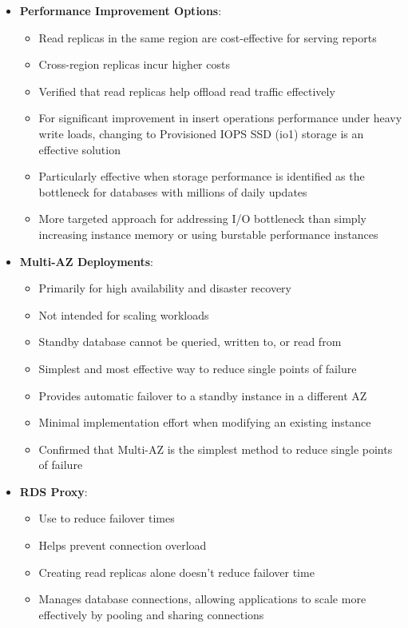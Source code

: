 \documentclass[11pt,a4paper]{report}
\begin{document}
\begin{itemize}
  \item \textbf{Performance Improvement Options}:
\begin{itemize}
  \item Read replicas in the same region are cost-effective for serving reports
  \item Cross-region replicas incur higher costs
  \item Verified that read replicas help offload read traffic effectively
  \item For significant improvement in insert operations performance under heavy write loads, changing to Provisioned IOPS SSD (io1) storage is an effective solution
  \item Particularly effective when storage performance is identified as the bottleneck for databases with millions of daily updates
  \item More targeted approach for addressing I/O bottleneck than simply increasing instance memory or using burstable performance instances
\end{itemize}
  \item \textbf{Multi-AZ Deployments}:
\begin{itemize}
  \item Primarily for high availability and disaster recovery
  \item Not intended for scaling workloads
  \item Standby database cannot be queried, written to, or read from
  \item Simplest and most effective way to reduce single points of failure
  \item Provides automatic failover to a standby instance in a different AZ
  \item Minimal implementation effort when modifying an existing instance
  \item Confirmed that Multi-AZ is the simplest method to reduce single points of failure
\end{itemize}
  \item \textbf{RDS Proxy}:
\begin{itemize}
  \item Use to reduce failover times
  \item Helps prevent connection overload
  \item Creating read replicas alone doesn't reduce failover time
  \item Manages database connections, allowing applications to scale more effectively by pooling and sharing connections

\end{itemize}
\end{itemize}
\end{document}
